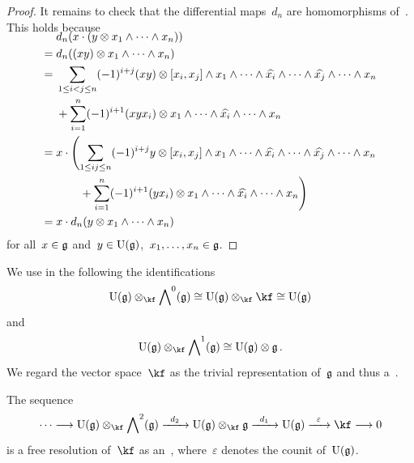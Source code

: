 \begin{proof}
	It remains to check that the differential maps~$d_n$ are homomorphisms of~\modules{$\Univ(\glie)$}.
	This holds because
	\begin{align*}
		\SwapAboveDisplaySkip
		{}&
		d_n(x \cdot (y \otimes x_1 \wedge \dotsb \wedge x_n) )
		\\
		={}&
		d_n( (xy) \otimes x_1 \wedge \dotsb \wedge x_n )
		\\
		={}&
		\sum_{1 \leq i < j \leq n}
		(-1)^{i+j}
		(xy) \otimes [x_i, x_j] \wedge x_1 \wedge \dotsb \wedge \widehat{x_i} \wedge \dotsb \wedge \widehat{x_j} \wedge \dotsb \wedge x_n
		\\
		{}&
		+
		\sum_{i=1}^n
		(-1)^{i+1}
		(x y x_i) \otimes x_1 \wedge \dotsb \wedge \widehat{ x_i } \wedge \dotsb \wedge x_n
		\\
		={}&
		x
		\cdot
		\Biggl(
		\sum_{1 \leq i  j \leq n}
			(-1)^{i+j}
			y \otimes [x_i, x_j] \wedge x_1 \wedge \dotsb \wedge \widehat{x_i} \wedge \dotsb \wedge \widehat{x_j} \wedge \dotsb \wedge x_n
		\\
		{}&
		\phantom{
			x \cdot
			\Biggl(
		}
			+
			\sum_{i=1}^n
			(-1)^{i+1}
			(y x_i) \otimes x_1 \wedge \dotsb \wedge \widehat{ x_i } \wedge \dotsb \wedge x_n
		\Biggr)
		\\
		={}&
		x \cdot d_n(y \otimes x_1 \wedge \dotsb \wedge x_n)
	\end{align*}
	for all~$x \in \mathfrak{g}$ and~$y \in \operatorname{U}(\mathfrak{g})$,~$x_1, \dotsc, x_n \in \mathfrak{g}$.
\end{proof}


\begin{fluff}
	We use in the following the identifications
	\[
		\Univ(\glie) \otimes_{\kf} \Exterior^0(\glie)
		\cong
		\Univ(\glie) \otimes_{\kf} \kf
		\cong
		\Univ(\glie)
	\]
	and
	\[
		\Univ(\glie) \otimes_{\kf} \Exterior^1(\glie)
		\cong
		\Univ(\glie) \otimes \glie \,.
	\]
	We regard the {\onedimensional} vector space~$\kf$ as the trivial representation of~$\mathfrak{g}$ and thus a~\module{$\Univ(\glie)$}.
\end{fluff}


\begin{theorem}
	\label{koszul is a free resolution}
	\leavevmode
	The sequence
	\begin{equation}
		\label{koszul complex written out}
		\dotsb
		\to
		\Univ(\glie) \otimes_{\kf} \Exterior^2(\glie)
		\xto{d_2}
		\Univ(\glie) \otimes_{\kf} \glie
		\xto{d_1}
		\Univ(\glie)
		\xto{\varepsilon}
		\kf
		\to
		0
	\end{equation}
	is a free resolution of~$\kf$ as an~\module{$\Univ(\glie)$}, where~$\varepsilon$ denotes the counit of~$\Univ(\glie)$.
\end{theorem}


